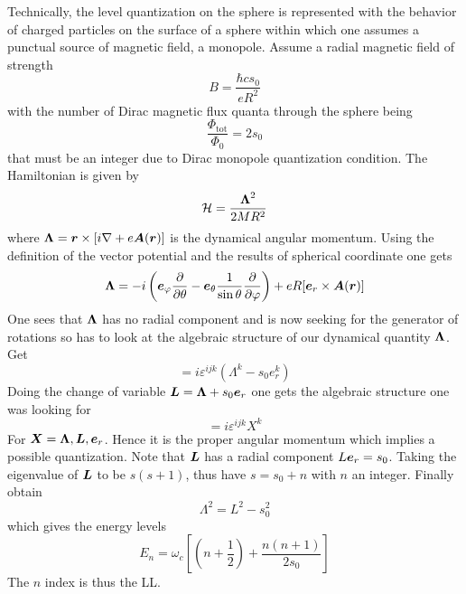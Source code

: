 		Technically, the level quantization on the sphere is represented with the behavior of charged particles on the surface of a sphere within which one assumes a punctual source of magnetic field, a monopole. Assume a radial magnetic field of strength
		\begin{equation}
		    B = \frac{\hbar cs_0}{eR^2}
		\end{equation}
		with the number of Dirac magnetic flux quanta through the sphere being 
		\begin{equation}
		    \frac{\Phi_\text{tot}}{\Phi_0} = 2s_0
		\end{equation}
		that must be an integer due to Dirac monopole quantization condition. The Hamiltonian is given by
		\begin{equation}
		    \mathcal H = \frac{\vb* \Lambda^2}{2MR^2}
		\end{equation}
		where $\vb* \Lambda = \vb* r \times [i\nabla + e \vb* A(\vb* r)]$ is the dynamical angular momentum. Using the definition of the vector potential and the results of spherical coordinate one gets
		\begin{equation}
		\vb* \Lambda = -i\left( \vb* e_{\varphi}\frac{\partial}{\partial\theta} - \vb* e_{\theta}\frac{1}{\sin\theta}\frac{\partial}{\partial\varphi}\right) + eR[\vb* e_r\times \vb* A(\vb* r)]
		\end{equation}
		One sees that $\vb* \Lambda$ has no radial component and is now seeking for the generator of rotations so has to look at the algebraic structure of our dynamical quantity $\vb* \Lambda$. Get
		\begin{equation}
		    [\Lambda^i,\Lambda^j] = i\varepsilon^{ijk}(\Lambda^k - s_0e_r^k)
		\end{equation}
		Doing the change of variable $\vb* L = \vb* \Lambda + s_0\vb* e_r$ one gets the algebraic structure one was looking for
		\begin{equation}
		    [L^i,X^j] = i\varepsilon^{ijk}X^k
		\end{equation}
		For $\vb* X = \vb* \Lambda, \vb* L,\vb* e_r$. Hence it is the proper angular momentum which implies a possible quantization. Note that $\vb* L$ has a radial component $L \vb* e_r = s_0$. Taking the eigenvalue of $\vb* L$ to be $s(s+1)$, thus have $s = s_0 + n$ with $n$ an integer. Finally obtain
		\begin{equation}
		    \Lambda^2 = L^2 - s_0^2
		\end{equation}
		which gives the energy levels
		\begin{equation}
		    E_n = \omega_c\left[\left(n + \frac{1}{2}\right) + \frac{n(n+1)}{2s_0}\right]
		\end{equation}
		The $n$ index is thus the LL.

